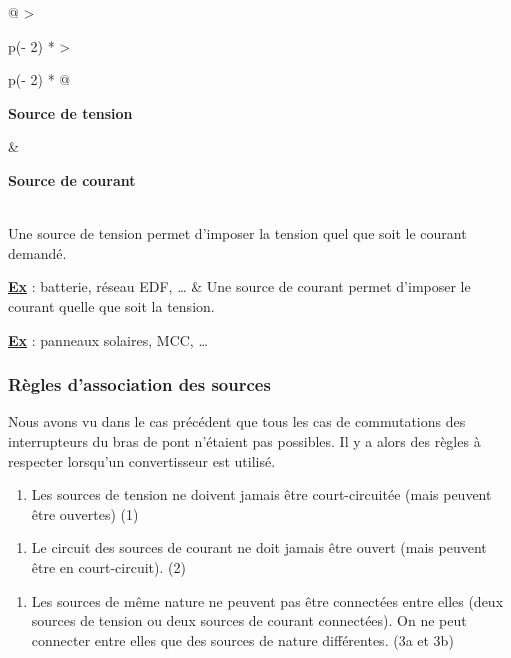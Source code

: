 \begin{longtable}[]{@{}
  >{\raggedright\arraybackslash}p{(\columnwidth - 2\tabcolsep) * }
  >{\raggedright\arraybackslash}p{(\columnwidth - 2\tabcolsep) * }@{}}
\toprule\noalign{}
\begin{minipage}[b]{\linewidth}\raggedright
\textbf{Source de tension}
\end{minipage} & \begin{minipage}[b]{\linewidth}\raggedright
\textbf{Source de courant}
\end{minipage} \\
\midrule\noalign{}
\endhead
\bottomrule\noalign{}
\endlastfoot
Une source de tension permet d'imposer la tension quel que soit le courant demandé.

\textbf{\ul{Ex}} : batterie, réseau EDF, \ldots{} & Une source de courant permet d'imposer le courant quelle que soit la tension.

\textbf{\ul{Ex}} : panneaux solaires, MCC, \ldots{} \\
\end{longtable}

\hypertarget{ruxe8gles-dassociation-des-sources}{%
\subsubsection{Règles d'association des sources}\label{ruxe8gles-dassociation-des-sources}}

Nous avons vu dans le cas précédent que tous les cas de commutations des interrupteurs du bras de pont n'étaient pas possibles. Il y a alors des règles à respecter lorsqu'un convertisseur est utilisé.

\begin{enumerate}
\def\labelenumi{\arabic{enumi}.}
\tightlist
\item
  Les sources de tension ne doivent jamais être court-circuitée (mais peuvent être ouvertes) (1)
\end{enumerate}

\begin{enumerate}
\def\labelenumi{\arabic{enumi}.}
\setcounter{enumi}{1}
\tightlist
\item
  Le circuit des sources de courant ne doit jamais être ouvert (mais peuvent être en court-circuit). (2)
\end{enumerate}

\begin{enumerate}
\def\labelenumi{\arabic{enumi}.}
\setcounter{enumi}{2}
\tightlist
\item
  Les sources de même nature ne peuvent pas être connectées entre elles (deux sources de tension ou deux sources de courant connectées). On ne peut connecter entre elles que des sources de nature différentes. (3a et 3b)
\end{enumerate}

